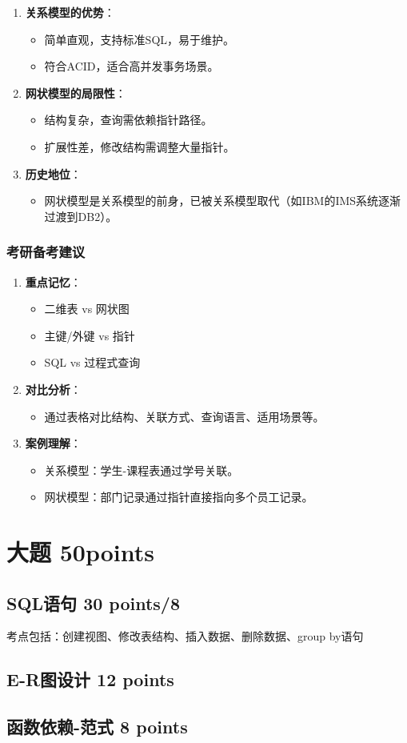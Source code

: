 \documentclass[a4paper,12pt,UTF8,fontset=none]{ctexart}
\begin{document}
\begin{enumerate}
    \item \textbf{关系模型的优势}：
    \begin{itemize}
        \item 简单直观，支持标准SQL，易于维护。
        \item 符合ACID，适合高并发事务场景。
    \end{itemize}
    \item \textbf{网状模型的局限性}：
    \begin{itemize}
        \item 结构复杂，查询需依赖指针路径。
        \item 扩展性差，修改结构需调整大量指针。
    \end{itemize}
    \item \textbf{历史地位}：
    \begin{itemize}
        \item 网状模型是关系模型的前身，已被关系模型取代（如IBM的IMS系统逐渐过渡到DB2）。
    \end{itemize}
\end{enumerate}

\subsubsection{考研备考建议}

\begin{enumerate}
    \item \textbf{重点记忆}：
    \begin{itemize}
        \item 二维表 vs 网状图
        \item 主键/外键 vs 指针
        \item SQL vs 过程式查询
    \end{itemize}
    \item \textbf{对比分析}：
    \begin{itemize}
        \item 通过表格对比结构、关联方式、查询语言、适用场景等。
    \end{itemize}
    \item \textbf{案例理解}：
    \begin{itemize}
        \item 关系模型：学生-课程表通过学号关联。
        \item 网状模型：部门记录通过指针直接指向多个员工记录。
    \end{itemize}
\end{enumerate}
\section{大题 50points}
\subsection{SQL语句 30 points/8}
考点包括：创建视图、修改表结构、插入数据、删除数据、group by语句
\subsection{E-R图设计 12 points}
\subsection{函数依赖-范式 8 points}
\end{document}
